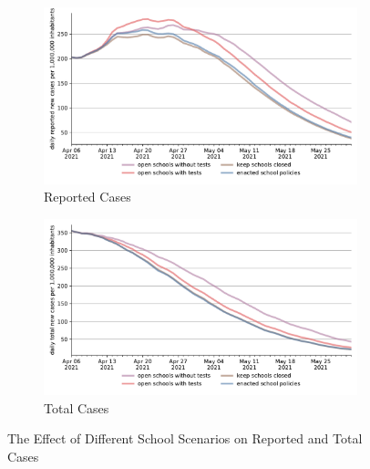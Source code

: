 

\begin{figure}[ht] %
  \centering
  \begin{subfigure}[b]{.49\textwidth}
    \centering
    \includegraphics[width=0.9 \textwidth]{figures/results/figures/scenario_comparisons/school_scenarios/full_new_known_case}
    \caption{Reported Cases}
    \label{fig:school_scenarios_new_known_case}
  \end{subfigure}%
  \hfill
  \begin{subfigure}[b]{.49\textwidth}
    \centering
    \includegraphics[width=0.9 \textwidth]{figures/results/figures/scenario_comparisons/school_scenarios/full_newly_infected}
    \caption{Total Cases}
    \label{fig:school_scenarios_newly_infected}
  \end{subfigure}
  \caption{The Effect of Different School Scenarios on Reported and Total Cases}
  \label{fig:school_scenarios_detailed}
\end{figure}
